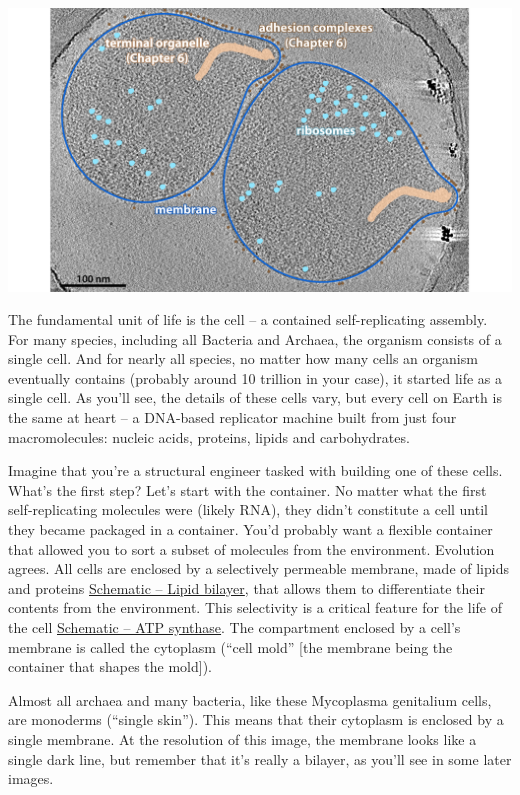 \documentclass[]{tufte-book}
\begin{document}
\includegraphics{img/02_static/2_1_Mgenitalium}

The fundamental unit of life is the cell -- a contained self-replicating
assembly. For many species, including all Bacteria and Archaea, the
organism consists of a single cell. And for nearly all species, no
matter how many cells an organism eventually contains (probably around
10 trillion in your case), it started life as a single cell. As you'll
see, the details of these cells vary, but every cell on Earth is the
same at heart -- a DNA-based replicator machine built from just four
macromolecules: nucleic acids, proteins, lipids and carbohydrates.

Imagine that you're a structural engineer tasked with building one of
these cells. What's the first step? Let's start with the container. No
matter what the first self-replicating molecules were (likely RNA), they
didn't constitute a cell until they became packaged in a container.
You'd probably want a flexible container that allowed you to sort a
subset of molecules from the environment. Evolution agrees. All cells
are enclosed by a selectively permeable membrane, made of lipids and
proteins \protect\hyperlink{fig:2-1-1}{Schematic -- Lipid bilayer}, that
allows them to differentiate their contents from the environment. This
selectivity is a critical feature for the life of the cell
\protect\hyperlink{fig:2-1-2}{Schematic -- ATP synthase}. The
compartment enclosed by a cell's membrane is called the cytoplasm
(``cell mold'' {[}the membrane being the container that shapes the
mold{]}).

Almost all archaea and many bacteria, like these Mycoplasma genitalium
cells, are monoderms (``single skin''). This means that their cytoplasm
is enclosed by a single membrane. At the resolution of this image, the
membrane looks like a single dark line, but remember that it's really a
bilayer, as you'll see in some later images.
\end{document}
